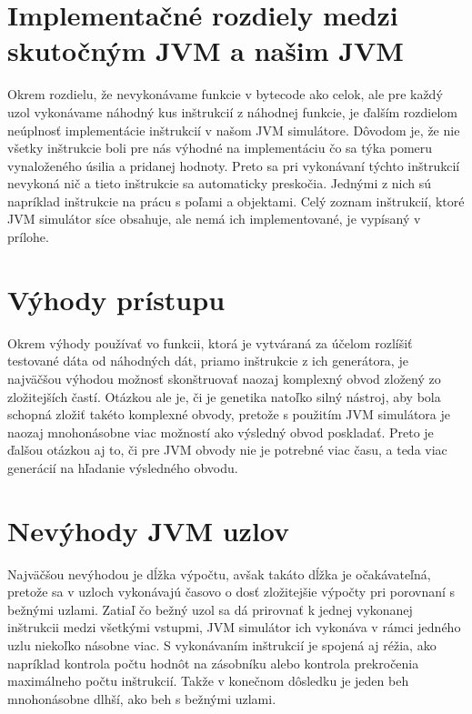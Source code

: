 \section{Implementačné rozdiely medzi skutočným JVM a našim JVM}
\label{sec:impl-diff}

Okrem rozdielu, že nevykonávame funkcie v bytecode ako celok, ale pre každý uzol vykonávame náhodný kus inštrukcií z náhodnej funkcie, je ďalším rozdielom neúplnosť implementácie inštrukcií v našom JVM simulátore. Dôvodom je, že nie všetky inštrukcie boli pre nás výhodné na implementáciu čo sa týka pomeru vynaloženého úsilia a pridanej hodnoty. Preto sa pri vykonávaní týchto inštrukcií nevykoná nič a tieto inštrukcie sa automaticky preskočia. Jednými z nich sú napríklad inštrukcie na prácu s poľami a objektami. Celý zoznam inštrukcií, ktoré JVM simulátor síce obsahuje, ale nemá ich implementované, je vypísaný v prílohe. 

\section{Výhody prístupu}
\label{sec:advantages}

Okrem výhody používať vo funkcii, ktorá je vytváraná za účelom rozlíšiť testované dáta od náhodných dát, priamo inštrukcie z ich generátora, je najväčšou výhodou možnosť skonštruovať naozaj komplexný obvod zložený zo zložitejších častí. Otázkou ale je, či je genetika natoľko silný nástroj, aby bola schopná zložiť takéto komplexné obvody, pretože s použitím JVM simulátora je naozaj mnohonásobne viac možností ako výsledný obvod poskladať. Preto je ďalšou otázkou aj to, či pre JVM obvody nie je potrebné viac času, a teda viac generácií na hľadanie výsledného obvodu.

\section{Nevýhody JVM uzlov}
\label{sec:disadvantages}

Najväčšou nevýhodou je dĺžka výpočtu, avšak takáto dĺžka je očakávateľná, pretože sa v uzloch vykonávajú časovo o dosť zložitejšie výpočty pri porovnaní s bežnými uzlami. Zatiaľ čo bežný uzol sa dá prirovnať k jednej vykonanej inštrukcii medzi všetkými vstupmi, JVM simulátor ich vykonáva v rámci jedného uzlu niekoľko násobne viac. S vykonávaním inštrukcií je spojená aj réžia, ako napríklad kontrola počtu hodnôt na zásobníku alebo kontrola prekročenia maximálneho počtu inštrukcií. Takže v konečnom dôsledku je jeden beh mnohonásobne dlhší, ako beh s bežnými uzlami.

